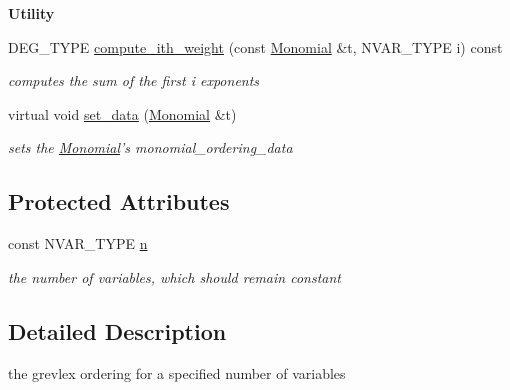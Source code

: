 \begin{Indent}\textbf{ Utility}\par
\begin{DoxyCompactItemize}
\item 
\mbox{\label{class_grevlex___ordering_a8c65377ef8f3015a6c03ef933b37550a}} 
D\+E\+G\+\_\+\+T\+Y\+PE \hyperlink{class_grevlex___ordering_a8c65377ef8f3015a6c03ef933b37550a}{compute\+\_\+ith\+\_\+weight} (const \hyperlink{class_monomial}{Monomial} \&t, N\+V\+A\+R\+\_\+\+T\+Y\+PE i) const
\begin{DoxyCompactList}\small\item\em computes the sum of the first i exponents \end{DoxyCompactList}\item 
\mbox{\label{class_grevlex___ordering_a293b981c2cc9f4f4a58d3af1a02f796b}} 
virtual void \hyperlink{class_grevlex___ordering_a293b981c2cc9f4f4a58d3af1a02f796b}{set\+\_\+data} (\hyperlink{class_monomial}{Monomial} \&t)
\begin{DoxyCompactList}\small\item\em sets the \hyperlink{class_monomial}{Monomial}'s {\ttfamily monomial\+\_\+ordering\+\_\+data} \end{DoxyCompactList}\end{DoxyCompactItemize}
\end{Indent}
\subsection*{Protected Attributes}
\begin{DoxyCompactItemize}
\item 
\mbox{\label{class_grevlex___ordering_a3fa495befedef829c12097e239fea97f}} 
const N\+V\+A\+R\+\_\+\+T\+Y\+PE \hyperlink{class_grevlex___ordering_a3fa495befedef829c12097e239fea97f}{n}
\begin{DoxyCompactList}\small\item\em the number of variables, which should remain constant \end{DoxyCompactList}\end{DoxyCompactItemize}


\subsection{Detailed Description}
the grevlex ordering for a specified number of variables 

